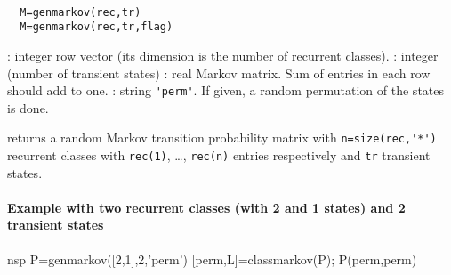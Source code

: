 
\begin{mandesc}
   \\ %
\end{mandesc}
\begin{calling_sequence}
\begin{verbatim}
  M=genmarkov(rec,tr)  
  M=genmarkov(rec,tr,flag)  
\end{verbatim}
\end{calling_sequence}
\begin{parameters}
  \begin{varlist}
    : integer row vector (its dimension is the number of recurrent classes).
    : integer (number of transient states)
    : real Markov matrix. Sum of entries in each row should add to one.
    : string \verb!'perm'!. If given, a random permutation of the states is done.
  \end{varlist}
\end{parameters}
\begin{mandescription}
  returns a random Markov transition probability matrix
  with \verb!n=size(rec,'*')! recurrent classes with \verb!rec(1)!, \ldots, \verb!rec(n)! 
  entries respectively and \verb!tr! transient states.
\end{mandescription}
\begin{examples}
  \paragraph{Example with two recurrent classes (with 2 and 1 states) and 2 transient states}
  \begin{mintednsp}{nsp}
    P=genmarkov([2,1],2,'perm')
    [perm,L]=classmarkov(P);
    P(perm,perm)
  \end{mintednsp}
\end{examples}
\begin{manseealso}
     
\end{manseealso}
